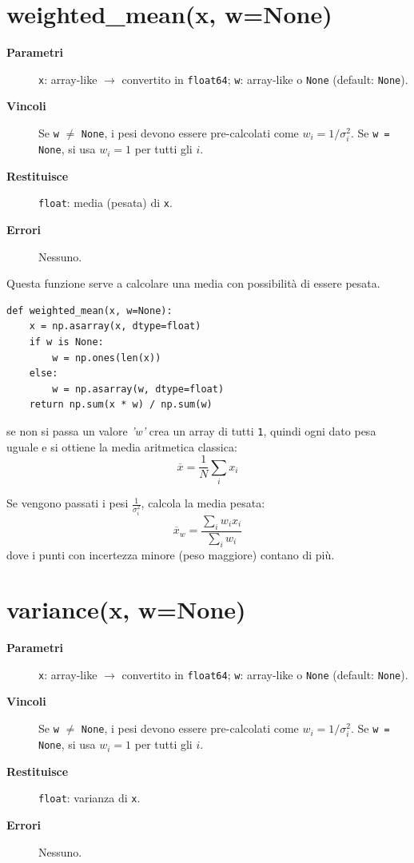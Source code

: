 \section{\texorpdfstring{weighted\_mean(x, w=None)}{weighted\_mean(x, w=None)}}
\label{sec:weighted-mean}
\begin{description}
  \item[\textbf{Parametri}]
    \texttt{x}: array-like $\to$ convertito in \texttt{float64};
    \texttt{w}: array-like o \texttt{None} (default: \texttt{None}).
  \item[\textbf{Vincoli}]
    Se \texttt{w} $\neq$ \texttt{None}, i pesi devono essere pre-calcolati come
    $w_i = 1/\sigma_i^2$. Se \texttt{w = None}, si usa $w_i = 1$ per tutti gli $i$.
  \item[\textbf{Restituisce}]
    \texttt{float}: media (pesata) di \texttt{x}.
  \item[\textbf{Errori}]
    Nessuno.
\end{description}

Questa funzione serve a calcolare una media con possibilità di essere pesata.
\begin{verbatim}
def weighted_mean(x, w=None):
    x = np.asarray(x, dtype=float)
    if w is None:
        w = np.ones(len(x))
    else:
        w = np.asarray(w, dtype=float)
    return np.sum(x * w) / np.sum(w)
\end{verbatim}

se non si passa un valore \textit{'w'} crea un array di tutti \texttt{1}, quindi ogni dato pesa uguale e si ottiene la media aritmetica classica:
$$\overline{x} = \frac{1}{N} \sum_i x_i$$

Se vengono passati i pesi $\frac{1}{\sigma^2_i}$, calcola la media pesata:
$$\overline{x}_w = \frac{\sum_i w_i x_i}{\sum_i w_i}$$
dove i punti con incertezza minore (peso maggiore) contano di più.

\section{variance(x, w=None)}
\label{sec:variance}
\begin{description}
  \item[\textbf{Parametri}]
    \texttt{x}: array-like $\to$ convertito in \texttt{float64};
    \texttt{w}: array-like o \texttt{None} (default: \texttt{None}).
  \item[\textbf{Vincoli}]
    Se \texttt{w} $\neq$ \texttt{None}, i pesi devono essere pre-calcolati come
    $w_i = 1/\sigma_i^2$. Se \texttt{w = None}, si usa $w_i = 1$ per tutti gli $i$.
  \item[\textbf{Restituisce}]
    \texttt{float}: varianza di \texttt{x}.
  \item[\textbf{Errori}]
    Nessuno.
\end{description}

